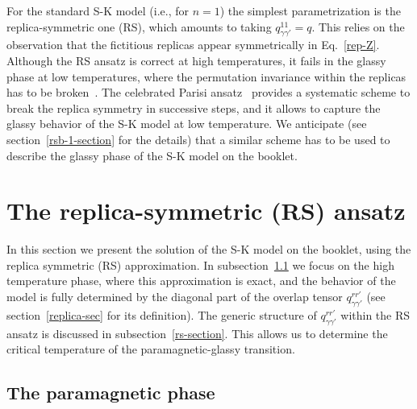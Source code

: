 \documentclass[twocolumn,superscriptaddress,prb,10pt]{revtex4-1}
\begin{document}
For the standard S-K model (i.e., for $n=1$) the simplest parametrization is the 
replica-symmetric one (RS), which amounts to taking $q^{11}_{\gamma\gamma'}=q$. 
This relies on the observation that the fictitious replicas appear symmetrically 
in Eq.~\eqref{rep-Z}. Although the RS ansatz is correct at high temperatures, it 
fails in the glassy phase at low temperatures, where the permutation invariance 
within the replicas has to be broken~\cite{almeida-1978}. The celebrated Parisi 
ansatz~\cite{parisi-1979} provides a systematic scheme to break the replica 
symmetry in successive steps, and it allows to capture the glassy behavior of 
the S-K model at low temperature. We anticipate (see section~\ref{rsb-1-section} for 
the details) that a similar scheme has to be used to describe the glassy phase of 
the S-K model on the booklet. 


\section{The replica-symmetric (RS) ansatz}
\label{solution}

In this section we present the solution of the S-K model on the booklet, using 
the replica symmetric (RS) approximation. In subsection~\ref{para-section} we focus 
on the high temperature phase, where this approximation is exact, and the 
behavior of the model is fully determined by the diagonal part of the overlap 
tensor $q_{\gamma\gamma'}^{rr'}$ (see section~\ref{replica-sec} for its 
definition). The generic structure of $q_{\gamma\gamma'}^{rr'}$ 
within the RS ansatz  is discussed in subsection~\ref{rs-section}. This allows us 
to determine the critical temperature of the paramagnetic-glassy transition. 

\subsection{The paramagnetic phase}
\label{para-section}
\end{document}
